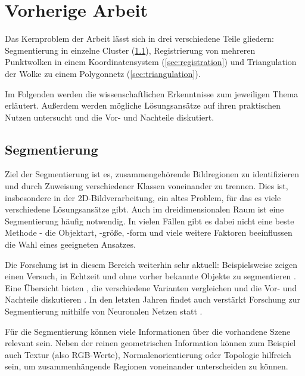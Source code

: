 
\chapter{Vorherige Arbeit}
\label{ch:vorherige-arbeit}

Das Kernproblem der Arbeit lässt sich in drei verschiedene Teile gliedern:
Segmentierung in einzelne Cluster (\ref{sec:segmentation}), Registrierung von mehreren Punktwolken in einem Koordinatensystem (\ref{sec:registration}) und Triangulation der Wolke zu einem Polygonnetz (\ref{sec:triangulation}).

Im Folgenden werden die wissenschaftlichen Erkenntnisse zum jeweiligen Thema erläutert.
Außerdem werden mögliche Lösungsansätze auf ihren praktischen Nutzen untersucht und die Vor- und Nachteile diskutiert.



\section{Segmentierung}
\label{sec:segmentation}

Ziel der Segmentierung ist es, zusammengehörende Bildregionen zu identifizieren und durch Zuweisung verschiedener Klassen voneinander zu trennen.
Dies ist, insbesondere in der 2D-Bildverarbeitung, ein altes Problem, für das es viele verschiedene Lösungsansätze gibt.
Auch im dreidimensionalen Raum ist eine Segmentierung häufig notwendig.
In vielen Fällen gibt es dabei nicht eine beste Methode - die Objektart, -größe, -form und viele weitere Faktoren beeinflussen die Wahl eines geeigneten Ansatzes.

Die Forschung ist in diesem Bereich weiterhin sehr aktuell:
Beispielsweise zeigen \citeauthor{uckermann2012real} einen Versuch, in Echtzeit und ohne vorher bekannte Objekte zu segmentieren \cite{uckermann2012real}.
Eine Übersicht bieten \citeauthor{nguyen20133d}, die verschiedene Varianten vergleichen und die Vor- und Nachteile diskutieren \cite{nguyen20133d}.
In den letzten Jahren findet auch verstärkt Forschung zur Segmentierung mithilfe von Neuronalen Netzen statt \cite{te2018rgcnn}.

Für die Segmentierung können viele Informationen über die vorhandene Szene relevant sein.
Neben der reinen geometrischen Information können zum Beispiel auch Textur (also RGB-Werte), Normalenorientierung oder Topologie hilfreich sein, um zusammenhängende Regionen voneinander unterscheiden zu können.

